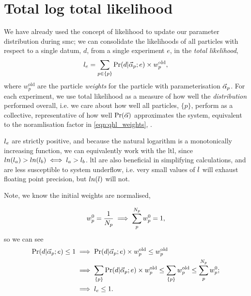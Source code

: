 \section{Total log total likelihood}\label{sec:total_log_total_likelihood}
We have already used the concept of  \gls{likelihood} to update our parameter distribution during \gls{smc}; 
    we can consolidate the \glspl{likelihood}  of all \glspl{particle} with respect to a single datum, $d$, from a single \gls{experiment} $e$,  
    in the \emph{\gls{total likelihood}}, 
    \begin{equation}
        \label{eqn:total_likelihood}
        l_{e} = \sum\limits_{p \in \{p\}} \Pr(d | \vec{\alpha}_p ; e) \times w_p^{\textrm{old}},
    \end{equation}
    where $w_p^{\textrm{old}}$ are the \gls{particle} \emph{weights} for the \gls{particle} with parameterisation $\vec{\alpha}_p$.
For each experiment, we use \gls{total likelihood} as a measure of how well the \emph{distribution} performed overall,
    i.e. we care about how well all \glspl{particle}, $\{p\}$, perform as a collective, representative of how well $\Pr(\vec{\alpha})$ approximates the system,
    equivalent to the noramlisation factor in \cref{eqn:qhl_weights}, \cite{granade2015characterizationp92}. 

$l_{e}$ are strictly positive, and because the natural logarithm is a monotonically increasing function, 
    we can equivalently work with the \gls{ltl}, 
    since $ln(l_a) > ln(l_b) \iff l_a > l_b$. 
\gls{ltl} are also beneficial in simplifying calculations, 
    and are less susceptible to system underflow, 
    i.e. very small values of $l$ will exhaust floating point precision, 
    but $ln(l)$ will not. 
\par 

Note, we know the initial weights are normalised,

\begin{equation}
    w_p^0 = \frac{1}{N_p}  \implies \sum_p^{N_p} w_p^0 = 1,
    \label{eqn:normalised_weights}
\end{equation}
    so we can see 
\begin{align}    
    \label{eqn:likelihood_deriv}
    \begin{split}
        \Pr(d | \vec{\alpha}_p; e) \leq 1 & \implies \Pr(d | \vec{\alpha}_p; e) \times w_p^{\textrm{old}} \leq w_p^{\textrm{old}} \\
        & \implies \sum\limits_{\{p\}} \Pr(d | \vec{\alpha}_p; e) \times w_p^{\textrm{old}} \leq \sum\limits_{\{p\}} w_p^{\textrm{old}} \leq \sum_p^{N_p} w_p^0; \\
        & \implies l_{e} \leq 1.
    \end{split}
\end{align}

